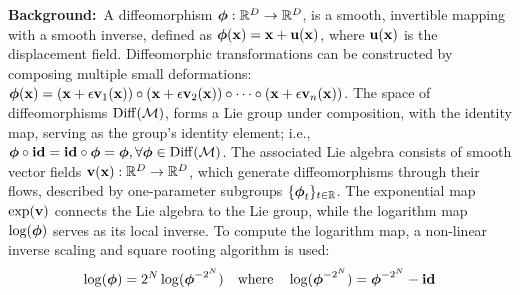 \textbf{Background:}~A diffeomorphism \({\boldsymbol{\phi}}: \mathbb{R}^D \to \mathbb{R}^D\), is a smooth, invertible mapping with a smooth inverse, defined as \({\boldsymbol{\phi}}(\mathbf{x}) = \mathbf{x} + \mathbf{u}(\mathbf{x})\), where \(\mathbf{u}(\mathbf{x})\) is the displacement field. Diffeomorphic transformations can be constructed by composing multiple small deformations:
\({\boldsymbol{\phi}}(\mathbf{x}) = (\mathbf{x} + \epsilon \mathbf{v}_{1}(\mathbf{x})) \circ (\mathbf{x} + \epsilon \mathbf{v}_{2}(\mathbf{x})) \circ \cdots \circ (\mathbf{x} + \epsilon \mathbf{v}_{n}(\mathbf{x}))\). The space of diffeomorphisms \( \mathrm{Diff}(\mathcal{M}) \), forms a Lie group under composition, with the identity map, serving as the group’s identity element; i.e., \({\boldsymbol{\phi}} \circ \mathbf{id} = \mathbf{id} \circ {\boldsymbol{\phi}} = {\boldsymbol{\phi}}, \forall {\boldsymbol{\phi}} \in \mathrm{Diff}(\mathcal{M})\). The associated Lie algebra consists of smooth vector fields \(\mathbf{v}(\mathbf{x}): \mathbb{R}^D \to \mathbb{R}^D\), which generate diffeomorphisms through their flows, described by one-parameter subgroups \(\{{\boldsymbol{\phi}}_t\}_{t \in \mathbb{R}}\). The exponential map \(\exp(\mathbf{v})\) connects the Lie algebra to the Lie group, while the logarithm map \(\log({\boldsymbol{\phi}})\) serves as its local inverse. To compute the logarithm map, a non-linear inverse scaling and square rooting algorithm \cite{arsigny2006log} is used:
\begin{equation}\label{nl-iss}
\operatorname{log}({\boldsymbol{\phi}}) = 2^N \operatorname{log}({\boldsymbol{\phi}}^{{-2}^N}) \quad \text{where} \quad \operatorname{log}({\boldsymbol{\phi}}^{{-2}^N}) = {\boldsymbol{\phi}}^{{-2}^N} - \mathbf{id} 
\end{equation}
